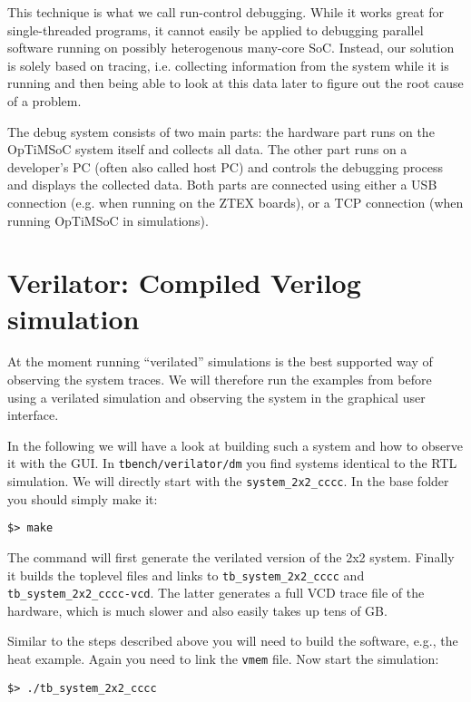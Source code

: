 This technique is what we call run-control debugging. While it works great for
single-threaded programs, it cannot easily be applied to debugging parallel
software running on possibly heterogenous many-core SoC. Instead, our solution
is solely based on tracing, i.e. collecting information from the system while
it is running and then being able to look at this data later to figure out the
root cause of a problem.

The debug system consists of two main parts: the hardware part runs on the
OpTiMSoC system itself and collects all data. The other part runs on a
developer's PC (often also called host PC) and controls the debugging process
and displays the collected data. Both parts are connected using either a USB
connection (e.g. when running on the ZTEX boards), or a TCP connection (when
running OpTiMSoC in simulations).

\section{Verilator: Compiled Verilog simulation}

At the moment running ``verilated'' simulations is the best supported
way of observing the system traces. We will therefore run the examples
from before using a verilated simulation and observing the system in
the graphical user interface.

In the following we will have a look at building such a system and how
to observe it with the GUI. In \verb|tbench/verilator/dm| you find
systems identical to the RTL simulation. We will directly start with
the \verb|system_2x2_cccc|. In the base folder you should simply make
it:

\begin{lstlisting}
$> make
\end{lstlisting}

The command will first generate the verilated version of the 2x2
system. Finally it builds the toplevel files and links to
\verb|tb_system_2x2_cccc| and \verb|tb_system_2x2_cccc-vcd|. The
latter generates a full VCD trace file of the hardware, which is
much slower and also easily takes up tens of GB.

Similar to the steps described above you will need to build the
software, e.g., the heat example. Again you need to link the
\verb|vmem| file. Now start the simulation:

\begin{lstlisting}
$> ./tb_system_2x2_cccc
\end{lstlisting}

